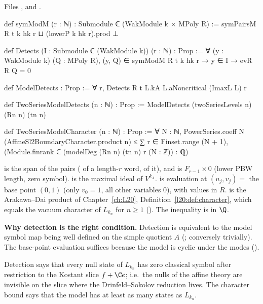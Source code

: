\noindent Files ,
 and
.
\begin{leancode}
def symModM (r : ℕ) : Submodule ℂ (WakModule k × MPoly R) :=
  symPairsM R t k hk r ⊔ (lowerP k hk r).prod ⊥

def Detects (I : Submodule ℂ (WakModule k)) (r : ℕ) : Prop :=
  ∀ (y : WakModule k) (Q : MPoly R), (y, Q) ∈ symModM R t k hk r → y ∈ I → evR R Q = 0

def ModelDetects : Prop :=
  ∀ r, Detects R t L.kA L.aNoncritical (ImaxL L) r

def TwoSeriesModelDetects (n : ℕ) : Prop :=
  ModelDetects (twoSeriesLevels n) (Rn n) (tn n)

def TwoSeriesModelCharacter (n : ℕ) : Prop :=
  ∀ N : ℕ, PowerSeries.coeff N (AffineSl2BoundaryCharacter.product n) ≤
    ∑ r ∈ Finset.range (N + 1), (Module.finrank ℂ (modelDeg (Rn n) (tn n) r (N : ℤ)) : ℚ)
\end{leancode}

\begin{dictionary}
 is the span of the pairs ( of a length-$r$ word,  of it), and
 is $F_{r-1}\times0$ (lower PBW length, zero symbol).  is the maximal ideal of
$V^{k_A}$.  is evaluation at $(u_j,v_j)=$ the base point $(0,1)$ (only $v_0=1$, all other variables $0$),
with values in $R$.  is the Arakawa--Dai product of Chapter~\ref{ch:L20},
Definition~\ref{l20:def:character}, which equals the vacuum character of $L_{k_n}$ for $n\ge1$
(). The inequality is in $\Q$.

\textbf{Why detection is the right condition.} Detection is equivalent to the model symbol map being well defined on
the simple quotient $A$ (; conversely trivially). The base-point evaluation suffices
because the model is cyclic under the modes ().
\end{dictionary}

\begin{physics}
Detection says that every null state of $L_{k_n}$ has zero classical symbol after restriction to the Kostant slice
$f+\C e$; i.e.\ the nulls of the affine theory are invisible on the slice where the Drinfeld--Sokolov reduction lives.
The character bound says that the model has at least as many states as $L_{k_n}$.
\end{physics}

